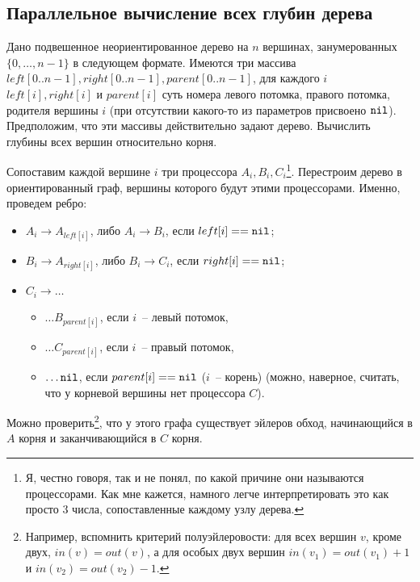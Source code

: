 \subsection{Параллельное вычисление всех глубин дерева}
\begin{problem*}
	Дано подвешенное неориентированное дерево на $n$ вершинах, занумерованных $\{0,\ldots,n-1\}$ в следующем формате. Имеются три массива $left[0..n-1], right[0..n-1], parent[0..n-1]$, для каждого $i$ $left[i], right[i] \text{ и } parent[i]$ суть номера левого потомка, правого потомка, родителя вершины $i$ (при отсутствии какого-то из параметров присвоено $\mathtt{nil}$). Предположим, что эти массивы действительно задают дерево. Вычислить глубины всех вершин относительно корня.
\end{problem*}
 Сопоставим каждой вершине $i$ три процессора $A_i, B_i, C_i$\footnote{Я, честно говоря, так и не понял, по какой причине они называются процессорами. Как мне кажется, намного легче интерпретировать это как просто 3 числа, сопоставленные каждому узлу дерева.}. Перестроим дерево в ориентированный граф, вершины которого будут этими процессорами. Именно, проведем ребро:
\begin{itemize}
	\item $A_i \rightarrow A_{left[i]}$, либо $A_i \rightarrow B_i$, если $left[i] == \mathtt{nil}$;
	\item $B_i \rightarrow A_{right[i]}$, либо $B_i \rightarrow C_i$, если $right[i] == \mathtt{nil}$;
	\item $C_i \rightarrow \ldots$
	\begin{itemize}
		\item $\ldots B_{parent[i]}$, если $i$~-- левый потомок,
		\item $\ldots C_{parent[i]}$, если $i$~-- правый потомок,
		\item $\ldots \mathtt{nil}$, если $parent[i] == \mathtt{nil}$ ($i$~-- корень) (можно, наверное, считать, что у корневой вершины нет процессора $C$).
	\end{itemize}
\end{itemize}

Можно проверить\footnote{Например, вспомнить критерий полуэйлеровости: для всех вершин $v$, кроме двух, $in(v) = out(v)$, а для особых двух вершин $in(v_1) = out(v_1) + 1$ и $in(v_2) = out(v_2) - 1$.}, что у этого графа существует эйлеров обход, начинающийся в $A$ корня и заканчивающийся в $C$ корня.

